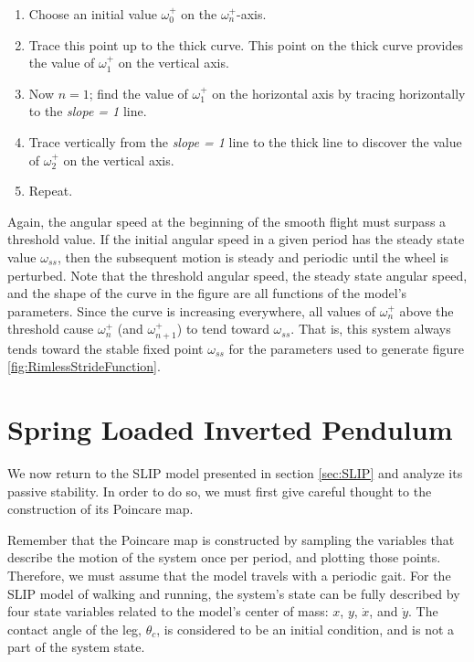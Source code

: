 \begin{enumerate}
\item Choose an initial value $\omega_{0}^{+}$ on the $\omega_{n}^{+}$-axis.
\item Trace this point up to the thick curve. This point on the thick curve provides the value of $\omega_{1}^{+}$ on the vertical axis.
\item Now $n = 1$; find the value of $\omega_{1}^{+}$ on the horizontal axis by
    tracing horizontally to the \textit{slope = 1} line.
\item Trace vertically from the \textit{slope = 1} line to the thick line to discover the value of $\omega_{2}^{+}$ on the vertical axis.
\item Repeat.
\end{enumerate}


Again, the angular speed at the beginning of the smooth flight must surpass a
threshold value. If the initial angular speed in a given period has the steady
state value $\omega_{ss}$, then the subsequent motion is steady and periodic
until the wheel is perturbed. Note that the threshold angular speed, the steady
state angular speed, and the shape of the curve in the figure are all functions
of the model's parameters. Since the curve is increasing everywhere, all values
of $\omega_n^+$ above the threshold cause $\omega_n^+$ (and $\omega_{n+1}^{+}$)
to tend toward $\omega_{ss}$. That is, this system always tends toward the
stable fixed point $\omega_{ss}$ for the parameters used to generate figure
\ref{fig:RimlessStrideFunction}.

\section{Spring Loaded Inverted Pendulum} %
\label{sec:SpringLoadedInvertedPendulum}

We now return to the SLIP model presented in section \ref{sec:SLIP} and analyze
its passive stability. In order to do so, we must first give careful thought to
the construction of its Poincare map. 

Remember that the Poincare map is constructed by sampling the variables that
describe the motion of the system once per period, and plotting those points.
Therefore, we must assume that the model travels with a periodic gait. For the
SLIP model of walking and running, the system's state can be fully described by
four state variables related to the model's center of mass: $x$, $y$,
$\dot{x}$, and $\dot{y}$. The contact angle of the leg, $\theta_{c}$, is
considered to be an initial condition, and is not a part of the system state.

